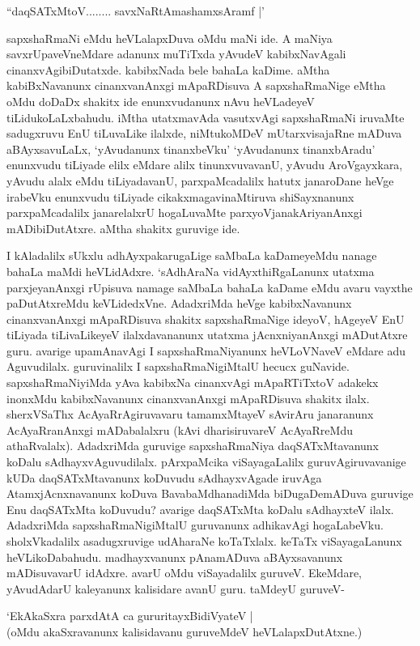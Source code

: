 \begin{shloka}
``daqSATxMtoV........ savxNaRtAmashamxsAramf |'
\end{shloka}

sapxshaRmaNi eMdu heVLalapxDuva oMdu maNi ide. A maNiya savxrUpaveVneMdare adanunx muTiTxda yAvudeV kabibxNavAgali cinanxvAgibiDutatxde. kabibxNada bele bahaLa kaDime. aMtha kabiBxNavanunx cinanxvanAnxgi mApaRDisuva A sapxshaRmaNige eMtha oMdu doDaDx shakitx ide enunxvudanunx nAvu heVLadeyeV tiLidukoLaLxbahudu. iMtha utatxmavAda vasutxvAgi sapxshaRmaNi iruvaMte sadugxruvu EnU tiLuvaLike ilalxde, niMtukoMDeV mUtarxvisajaRne mADuva aBAyxsavuLaLx, `yAvudanunx tinanxbeVku' `yAvudanunx tinanxbAradu' enunxvudu tiLiyade elilx eMdare alilx tinunxvuvavanU, yAvudu AroVgayxkara, yAvudu alalx eMdu tiLiyadavanU, parxpaMcadalilx hatutx janaroDane heVge irabeVku enunxvudu tiLiyade cikakxmagavinaMtiruva shiSayxnanunx parxpaMcadalilx janarelalxrU hogaLuvaMte parxyoVjanakAriyanAnxgi mADibiDutAtxre. aMtha shakitx guruvige ide.

I kAladalilx sUkxlu adhAyxpakarugaLige saMbaLa kaDameyeMdu nanage bahaLa maMdi heVLidAdxre. `sAdhAraNa vidAyxthiRgaLanunx utatxma parxjeyanAnxgi rUpisuva namage saMbaLa bahaLa kaDame eMdu avaru vayxthe paDutAtxreMdu keVLidedxVne. AdadxriMda heVge kabibxNavanunx cinanxvanAnxgi mApaRDisuva shakitx sapxshaRmaNige ideyoV, hAgeyeV EnU tiLiyada tiLivaLikeyeV ilalxdavananunx utatxma jAcnxniyanAnxgi mADutAtxre guru. avarige upamAnavAgi I sapxshaRmaNiyanunx heVLoVNaveV eMdare adu Aguvudilalx. guruvinalilx I sapxshaRmaNigiMtalU hecucx guNavide. sapxshaRmaNiyiMda yAva kabibxNa cinanxvAgi mApaRTiTxtoV adakekx inonxMdu kabibxNavanunx cinanxvanAnxgi mApaRDisuva shakitx ilalx. sherxVSaThx AcAyaRrAgiruvavaru tamamxMtayeV sAvirAru janaranunx AcAyaRranAnxgi mADabalalxru (kAvi dharisiruvareV AcAyaRreMdu athaRvalalx). AdadxriMda guruvige sapxshaRmaNiya daqSATxMtavanunx koDalu sAdhayxvAguvudilalx. pArxpaMcika viSayagaLalilx guruvAgiruvavanige kUDa daqSATxMtavanunx koDuvudu sAdhayxvAgade iruvAga AtamxjAcnxnavanunx koDuva BavabaMdhanadiMda biDugaDemADuva guruvige Enu daqSATxMta koDuvudu? avarige daqSATxMta koDalu sAdhayxteV ilalx. AdadxriMda sapxshaRmaNigiMtalU guruvanunx adhikavAgi hogaLabeVku. sholxVkadalilx asadugxruvige udAharaNe koTaTxlalx. keTaTx viSayagaLanunx heVLikoDabahudu. madhayxvanunx pAnamADuva aBAyxsavanunx mADisuvavarU idAdxre. avarU oMdu viSayadalilx guruveV. EkeMdare, yAvudAdarU kaleyanunx kalisidare avanU guru. taMdeyU guruveV-

\begin{shloka}
`EkAkaSxra parxdAtA ca gururitayxBidiVyateV |\\
(oMdu akaSxravanunx kalisidavanu guruveMdeV heVLalapxDutAtxne.)
\end{shloka} 

